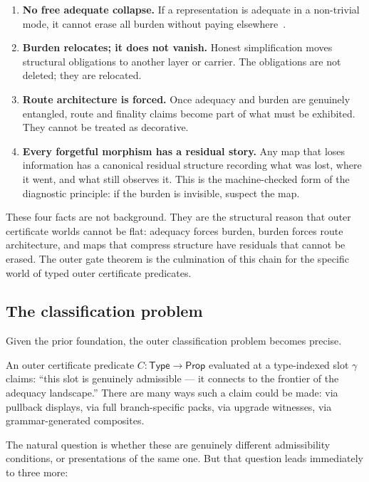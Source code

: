 \documentclass[11pt]{article}
\theoremstyle{plain}
\theoremstyle{definition}
\theoremstyle{remark}
\begin{document}
\begin{enumerate}
  \item \textbf{No free adequate collapse.}
    If a representation is adequate in a non-trivial mode, it cannot erase
    all burden without paying elsewhere~\cite{SpivackAdequacy}.

  \item \textbf{Burden relocates; it does not vanish.}
    Honest simplification moves structural obligations to another layer or
    carrier.  The obligations are not deleted; they are relocated.

  \item \textbf{Route architecture is forced.}
    Once adequacy and burden are genuinely entangled, route and finality
    claims become part of what must be exhibited.  They cannot be
    treated as decorative.

  \item \textbf{Every forgetful morphism has a residual story.}
    Any map that loses information has a canonical residual structure
    recording what was lost, where it went, and what still observes it.
    This is the machine-checked form of the diagnostic principle:
    if the burden is invisible, suspect the map.
\end{enumerate}

These four facts are not background.  They are the structural reason that
outer certificate worlds cannot be flat: adequacy forces burden, burden
forces route architecture, and maps that compress structure have residuals
that cannot be erased.  The outer gate theorem is the culmination of this
chain for the specific world of typed outer certificate predicates.

\subsection{The classification problem}

Given the prior foundation, the outer classification problem becomes precise.

An outer certificate predicate $C : \mathsf{Type} \to \mathsf{Prop}$
evaluated at a type-indexed slot $\gamma$ claims: ``this slot is genuinely
admissible --- it connects to the frontier of the adequacy landscape.''
There are many ways such a claim could be made: via pullback displays,
via full branch-specific packs, via upgrade witnesses, via grammar-generated
composites.

The natural question is whether these are genuinely different admissibility
conditions, or presentations of the same one.  But that question leads
immediately to three more:
\end{document}
